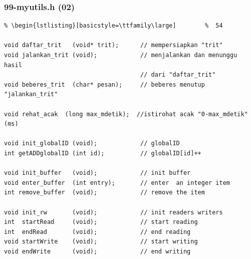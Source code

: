 \documentclass[xcolor=table, notheorems, hyperref={pdfpagelabels=false}]{beamer}
\begin{document}
\begin{frame}[fragile]
\frametitle{99-myutils.h (02)}
\begin{lstlisting}[basicstyle=\ttfamily\footnotesize] %  72
% \begin{lstlisting}[basicstyle=\ttfamily\small]        %  65
% \begin{lstlisting}[basicstyle=\ttfamily\large]        %  54

void daftar_trit   (void* trit);      // mempersiapkan "trit"
void jalankan_trit (void);            // menjalankan dan menunggu hasil 
                                      // dari "daftar_trit"
void beberes_trit  (char* pesan);     // beberes menutup "jalankan_trit"

void rehat_acak  (long max_mdetik);  //istirohat acak "0-max_mdetik"(ms)

void init_globalID (void);            // globalID
int getADDglobalID (int id);          // globalID[id]++

void init_buffer   (void);            // init buffer
void enter_buffer  (int entry);       // enter  an integer item 
int remove_buffer  (void);            // remove the item

void init_rw       (void);            // init readers writers
int  startRead     (void);            // start reading
int  endRead       (void);            // end reading
void startWrite    (void);            // start writing
void endWrite      (void);            // end writing

\end{lstlisting}
\end{frame}

\end{document}
